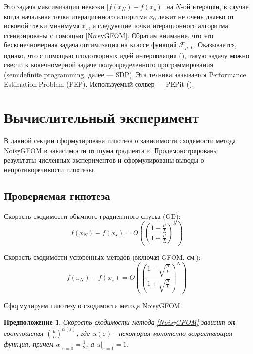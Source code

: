 \documentclass{article}
\newtheorem{proposition}{Предположение}
\begin{document}
Это задача максимизации невязки $|f(x_N) - f(x_{\star})|$ на $N$-ой итерации, в случае когда начальная точка итерационного алгоритма $x_0$ лежит не очень далеко от искомой точки минимума $x_{\star}$, а следующие точки итерационного алгоритма сгенерированы с помощью \ref{NoisyGFOM}. Обратим внимание, что это бесконечномерная задача оптимизации на  классе функций $\mathcal{F}_{\mu, L}$. Оказывается, однако, что с помощью плодотворных идей интерполяции (\cite{taylor2017smooth}), такую задачу можно свести к конечномерной задаче полуопределенного программирования (semidefinite programming, далее --- SDP). Эта техника называется Performance Estimation Problem (PEP). Используемый солвер --- PEPit (\cite{goujaud2022pepit}).


\section{Вычислительный эксперимент}
В данной секции сформулирована гипотеза о зависимости сходимости метода NoisyGFOM в зависимости от шума градиента $\varepsilon$. Продемонстрированы результаты численных экспериментов и сформулированы выводы о непротиворечивости гипотезы.

\subsection{Проверяемая гипотеза}

Скорость сходимости обычного градиентного спуска (GD):
\begin{equation}\label{GDconverge}
   f(x_N) - f(x_{\star}) = O\left(\left(\frac{1 - \frac{\mu}{L}}{1 + \frac{\mu}{L}}\right)^N\right)
\end{equation}

Скорость сходимости ускоренных методов (включая GFOM, см.\cite{convex_opt_mipt}):
\begin{equation} \label{GFOMconverge}
    f(x_N) - f(x_{\star}) = O\left(\left(\frac{1 - \sqrt{\frac{\mu}{L}}}{1 + \sqrt{\frac{\mu}{L}}}\right)^N\right) 
\end{equation}



Сформулируем гипотезу о сходимости метода NoisyGFOM.

\begin{proposition}
Скорость сходимости метода \ref{NoisyGFOM} зависит от соотношения $\left(\frac{\mu}{L}\right)^{\alpha(\varepsilon)}$, где $\alpha(\varepsilon)$ - некоторая монотонно возрастающая функция, причем $\alpha|_{\varepsilon = 0} = \frac12$, а $\alpha|_{\varepsilon = 1} = 1$. 
\end{proposition}
\end{document}
